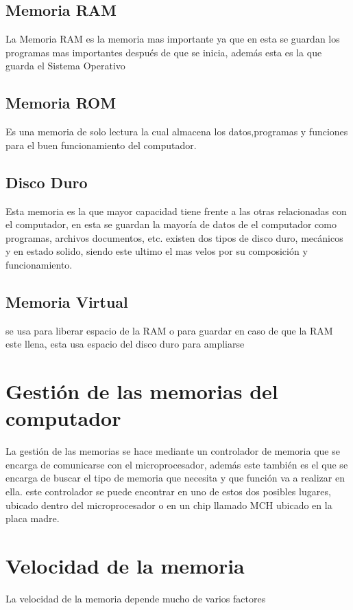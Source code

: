 \documentclass{article}
\begin{document}
	\subsection{Memoria RAM}
	La Memoria RAM es la memoria mas importante ya que en esta se guardan los programas mas importantes después de que se inicia, además esta es la que guarda el Sistema Operativo
	
	\subsection{Memoria ROM}
	Es una memoria de solo lectura la cual almacena los datos,programas y funciones para el buen funcionamiento del computador.\cite{rom}
	
	\subsection{Disco Duro}
	Esta memoria es la que mayor capacidad tiene frente a las otras relacionadas con el computador, en esta se guardan la mayoría de datos de el computador como programas, archivos documentos, etc. existen dos tipos de disco duro, mecánicos y en estado solido, siendo este ultimo el mas velos por su composición y funcionamiento.
	
	\subsection{Memoria Virtual}
	se usa para liberar espacio de la RAM o para guardar en caso de que la RAM este llena, esta usa espacio del disco duro para ampliarse
	
	\section{Gestión de las memorias del computador}
	La gestión de las memorias se hace mediante un controlador de memoria que se encarga de comunicarse con el microprocesador, además este también es el que se encarga de buscar el tipo de memoria que necesita y que función va a realizar en ella.
	este controlador se puede encontrar en uno de estos dos posibles lugares, ubicado dentro del microprocesador o en un chip llamado MCH ubicado en la placa madre.\cite{memoria}
	
	\section{Velocidad de la memoria}
	La velocidad de la memoria depende mucho de varios factores
	
	
	
	
	
\end{document}
